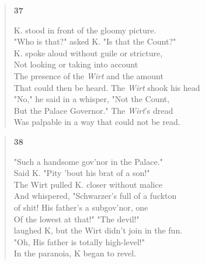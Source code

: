 \documentclass{article}
\begin{document}
\begin{verse}
  \begin{center}
    \textbf{37} \\
  \end{center}
  K. stood in front of the gloomy picture. \\
  "Who is that?" asked K. "Is that the Count?" \\
  K. spoke aloud without guile or stricture, \\
  Not looking or taking into account \\
  The presence of the \textit{Wirt} and the amount \\
  That could then be heard. The \textit{Wirt} shook his head \\
  "No," he said in a whisper, "Not the Count, \\
  But the Palace Governor." The \textit{Wirt}'s dread \\
  Was palpable in a way that could not be read.
\end{verse}

\begin{verse}
  \begin{center}
    \textbf{38} \\
  \end{center}
  "Such a handsome gov'nor in the Palace." \\
  Said K. "Pity 'bout his brat of a son!" \\
  The Wirt pulled K. closer without malice \\
  And whispered, "Schwarzer's full of a fuckton \\
  of shit! His father's a subgov'nor, one \\
  Of the lowest at that!" "The devil!" \\
  laughed K, but the Wirt didn't join in the fun. \\
  "Oh, His father is totally high-level!" \\
  In the paranoia, K began to revel. \\
\end{verse}
\end{document}
